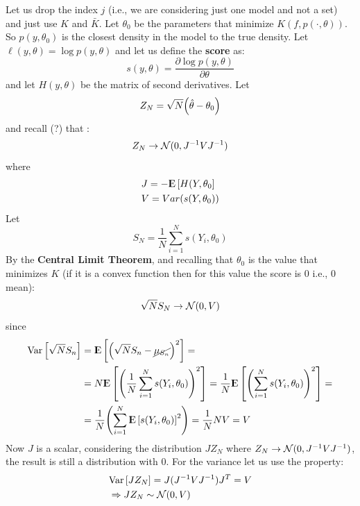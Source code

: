 \documentclass[12pt, letterpaper]{article}
\theoremstyle{definition}
\newcommand{\E}{{\rm I\kern-.3em E}}
\newcommand{\Var}{\mathrm{Var}}
\DeclarePairedDelimiter\autobracket{(}{)}
\newcommand{\br}[1]{\autobracket*{#1}}
\begin{document}
Let us drop the index $j$ (i.e., we are considering just one model and not a set) and just use $K$ and $\bar{K}$. Let $\theta_0$ be the parameters that minimize $K(f,p(\cdot, \theta))$. So $p(y, \theta_0)$ is the closest density in the model to the true density. Let $\ell(y,\theta)=\log p (y, \theta)$ and let us define the \textbf{score} as:
\begin{equation}
s(y,\theta) = \frac{\partial \log p (y, \theta)}{\partial \theta}
\end{equation}
and let $H(y, \theta)$ be the matrix of second derivatives.
Let
\begin{equation}
Z_N = \sqrt{N}\br{\hat{\theta} - \theta_0}
\end{equation}
and recall (?) that :
\begin{equation}
Z_N \rightarrow \CMcal{N}(0, J^{-1}VJ^{-1})
\end{equation}
where 
\begin{equation}
\begin{aligned}
&J = -\E\left[ H(Y,\theta_0\right]\\
& V = Var(s(Y,\theta_0))
\end{aligned}
\end{equation}
Let 
\begin{equation}
S_N = \frac{1}{N}\sum_{i=1}^N s(Y_i, \theta_0)
\end{equation}
By the \textbf{Central Limit Theorem}, and recalling that $\theta_0$ is the value that minimizes $K$ (if it is a convex function then for this value the score is $0$ i.e., $0$ mean):
\begin{equation}
\sqrt{N}S_N \rightarrow \CMcal{N}(0, V)
\end{equation}
since 
\begin{equation}
\begin{aligned}
\Var\left[ \sqrt{N} S_n\right] &= \E\left[ \br{\sqrt{N} S_n - \cancel{\mu_{S_n}}}^2\right]= \\
&= N \E\left[ \br{\frac{1}{N}\sum_{i=1}^N s(Y_i, \theta_0)}^2\right] = \frac{1}{N} \E\left[ \br{\sum_{i=1}^N s(Y_i, \theta_0)}^2\right] =\\
&= \frac{1}{N}  \br{\sum_{i=1}^N \E\left[s(Y_i, \theta_0)\right]^2} =\frac{1}{N} NV=V
\end{aligned}
\end{equation}
Now $J$ is a scalar, considering the distribution $JZ_N$ where $Z_N \rightarrow\CMcal{N}(0, J^{-1}VJ^{-1})$, the result is still a distribution with $0$. For the variance let us use the property:
\begin{equation}
\begin{aligned}
&\Var\left[ JZ_N\right] = J(J^{-1}VJ^{-1})J^T = V\\
&\Rightarrow JZ_N \sim \CMcal{N}(0,V)
\end{aligned}
\label{varMul}
\end{equation}
\end{document}
